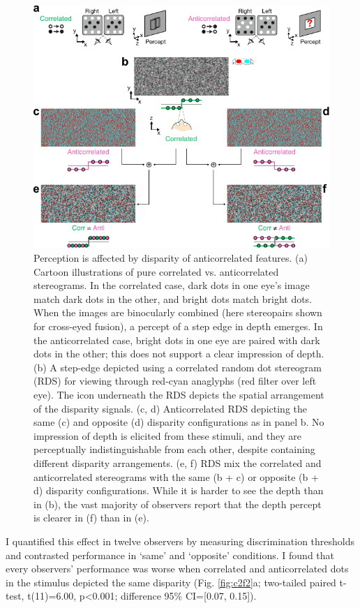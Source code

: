 \begin{figure}
  \centering
  \includegraphics{Fig1}
  \caption[Perception is affected by disparity of anticorrelated features.]{Perception is affected by disparity of anticorrelated features. (a) Cartoon illustrations of pure correlated vs. anticorrelated stereograms. In the correlated case, dark dots in one eye's image match dark dots in the other, and bright dots match bright dots. When the images are binocularly combined (here stereopairs shown for cross-eyed fusion), a percept of a step edge in depth emerges. In the anticorrelated case, bright dots in one eye are paired with dark dots in the other; this does not support a clear impression of depth. (b) A step-edge depicted using a correlated random dot stereogram (RDS) for viewing through red-cyan anaglyphs (red filter over left eye). The icon underneath the RDS depicts the spatial arrangement of the disparity signals. (c, d) Anticorrelated RDS depicting the same (c) and opposite (d) disparity configurations as in panel b. No impression of depth is elicited from these stimuli, and they are perceptually indistinguishable from each other, despite containing different disparity arrangements. (e, f) RDS mix the correlated and anticorrelated stereograms with the same (b + c) or opposite (b + d) disparity configurations. While it is harder to see the depth than in (b), the vast majority of observers report that the depth percept is clearer in (f) than in (e).}
  \label{fig:c2f1}
\end{figure}


I quantified this effect in twelve observers by measuring discrimination thresholds and contrasted performance in `same' and `opposite' conditions. I found that every observers' performance was worse when correlated and anticorrelated dots in the stimulus depicted the same disparity (Fig. \ref{fig:c2f2}a; two-tailed paired t-test, t(11)=6.00, p<0.001; difference 95\% CI=[0.07, 0.15]).

